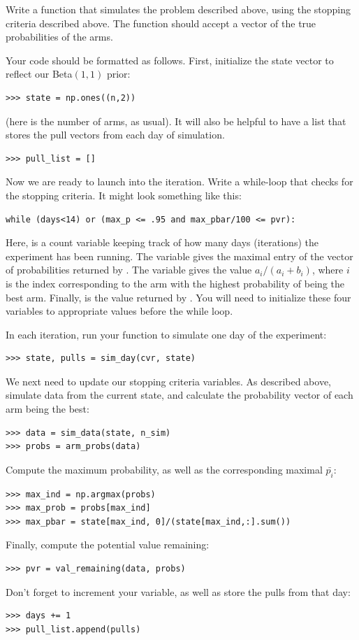 \begin{problem}
Write a function  that simulates the problem described above,
using the stopping criteria described above.
The function should accept a vector of the true probabilities of the arms.

Your code should be formatted as follows.
First, initialize the state vector to reflect our Beta$(1,1)$ prior:
\begin{lstlisting}
>>> state = np.ones((n,2))
\end{lstlisting}
(here  is the number of arms, as usual).
It will also be helpful to have a list  that stores
the pull vectors from each day of simulation.
\begin{lstlisting}
>>> pull_list = []
\end{lstlisting}

Now we are ready to launch into the iteration.
Write a while-loop that checks for the stopping criteria.
It might look something like this:
\begin{lstlisting}
while (days<14) or (max_p <= .95 and max_pbar/100 <= pvr):
\end{lstlisting}
Here,  is a count variable keeping track of how many days (iterations) the experiment
has been running. The variable  gives the maximal entry of the vector of
probabilities returned by . The variable  gives the value
$a_i/(a_i+b_i)$, where $i$ is the index corresponding to the arm with the highest
probability of being the best arm. Finally,  is the value returned by
. You will need to initialize these four variables to appropriate
values before the while loop.

In each iteration, run your  function to simulate one day of the experiment:
\begin{lstlisting}
>>> state, pulls = sim_day(cvr, state)
\end{lstlisting}
We next need to update our stopping criteria variables.
As described above, simulate data from the current state, and calculate the
probability vector of each arm being the best:
\begin{lstlisting}
>>> data = sim_data(state, n_sim)
>>> probs = arm_probs(data)
\end{lstlisting}
Compute the maximum probability, as well as the corresponding maximal $\bar{p_i}$:
\begin{lstlisting}
>>> max_ind = np.argmax(probs)
>>> max_prob = probs[max_ind]
>>> max_pbar = state[max_ind, 0]/(state[max_ind,:].sum())
\end{lstlisting}
Finally, compute the potential value remaining:
\begin{lstlisting}
>>> pvr = val_remaining(data, probs)
\end{lstlisting}
Don't forget to increment your  variable, as well as store the pulls from
that day:
\begin{lstlisting}
>>> days += 1
>>> pull_list.append(pulls)
\end{lstlisting}


\end{problem}
